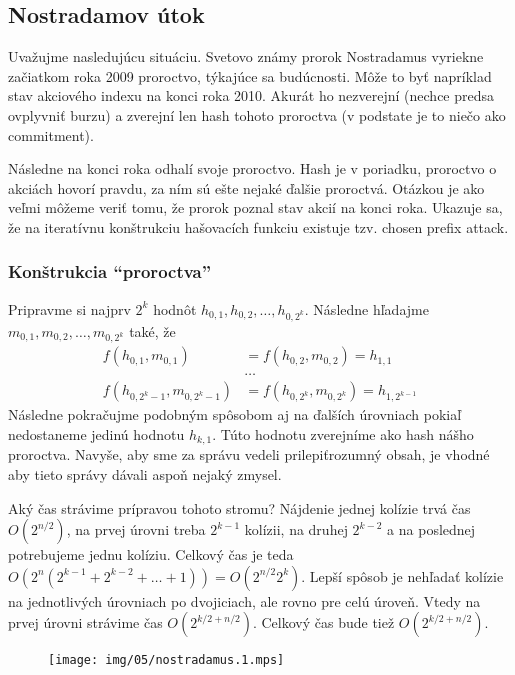 \subsection{Nostradamov útok}

Uvažujme nasledujúcu situáciu. Svetovo známy prorok Nostradamus
vyriekne začiatkom roka 2009 proroctvo, týkajúce sa budúcnosti.
Môže to byť napríklad stav akciového indexu na konci roka 2010.
Akurát ho nezverejní (nechce predsa ovplyvniť burzu) a zverejní
len hash tohoto proroctva (v podstate je to niečo ako commitment).

Následne na konci roka odhalí svoje proroctvo. Hash je v poriadku, proroctvo
o akciách hovorí pravdu, za ním sú ešte nejaké ďalšie proroctvá.
Otázkou je ako veľmi môžeme veriť tomu, že prorok poznal stav
akcií na konci roka. Ukazuje sa, že na iteratívnu konštrukciu
hašovacích funkciu existuje tzv. chosen prefix attack.

\subsubsection{Konštrukcia ``proroctva''}

Pripravme si najprv $2^k$ hodnôt $h_{0,1}, h_{0,2}, \dots, h_{0,2^k}$.
Následne hľadajme $m_{0,1}, m_{0,2}, \dots, m_{0,2^k}$ také, že
\begin{align*}
    f(h_{0,1}, m_{0,1}) &= f(h_{0,2}, m_{0,2}) = h_{1,1} \\
  &  \dots \\
    f(h_{0,2^k-1}, m_{0,2^k-1}) &= f(h_{0,2^k}, m_{0,2^k}) = h_{1,
        2^{k-1}} 
\end{align*}
Následne pokračujme podobným spôsobom aj na ďalších úrovniach
pokiaľ nedostaneme jedinú hodnotu $h_{k,1}$.
Túto hodnotu zverejníme ako hash nášho proroctva.
Navyše, aby sme za správu vedeli \clqq prilepiť\crqq rozumný obsah,
je vhodné aby tieto správy dávali aspoň nejaký zmysel.

Aký čas strávime prípravou tohoto stromu?
Nájdenie jednej kolízie trvá čas $O(2^{n/2})$, na prvej úrovni treba 
$2^{k-1}$ kolízii, na druhej $2^{k-2}$ a na poslednej
potrebujeme jednu kolíziu. Celkový čas je teda
$O(2^n (2^{k-1} + 2^{k-2} + \dots + 1)) = O(2^{n/2} 2^k)$.
Lepší spôsob je nehľadať kolízie na jednotlivých úrovniach po dvojiciach,
ale rovno pre celú úroveň.
Vtedy na prvej úrovni strávime čas $O(2^{k/2 + n/2})$. 
Celkový čas bude tiež $O(2^{k/2 + n/2})$.

\begin{figure}[h]
    \centering
    \texttt{[image: img/05/nostradamus.1.mps]}
\end{figure}

